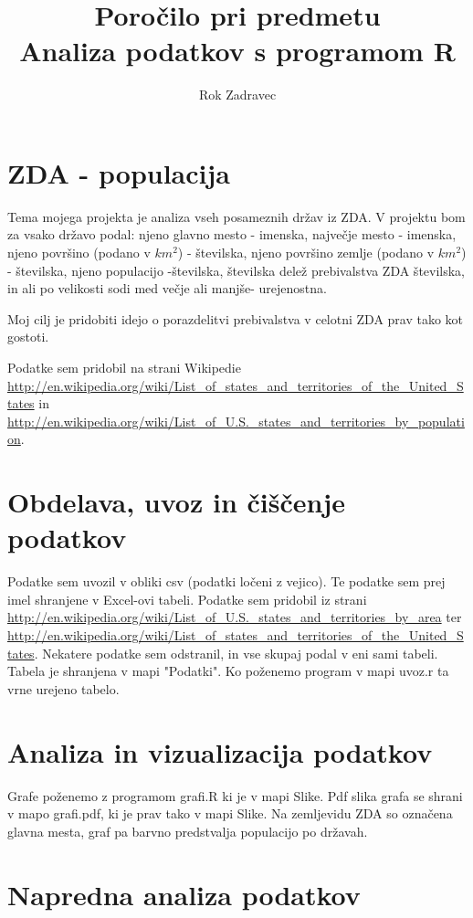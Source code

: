 \documentclass[11pt,a4paper]{article}
\begin{document}
\title{Poročilo pri predmetu \\
Analiza podatkov s programom R}
\author{Rok Zadravec}
\maketitle

\section{ZDA - populacija}

Tema mojega projekta je analiza vseh posameznih držav iz ZDA. V projektu bom za vsako državo podal: njeno glavno mesto - imenska, največje mesto - imenska, njeno površino (podano v $km^2$) - številska, njeno površino zemlje (podano v $km^2$) - številska, njeno populacijo -številska, številska delež prebivalstva ZDA številska, in ali po velikosti sodi med večje ali manjše- urejenostna.

Moj cilj je pridobiti idejo o porazdelitvi prebivalstva v celotni ZDA prav tako kot gostoti.

Podatke sem pridobil na strani Wikipedie \url{http://en.wikipedia.org/wiki/List_of_states_and_territories_of_the_United_States} in \url{http://en.wikipedia.org/wiki/List_of_U.S._states_and_territories_by_population}.

\section{Obdelava, uvoz in čiščenje podatkov}

Podatke sem uvozil v obliki csv (podatki ločeni z vejico). Te podatke sem prej imel shranjene v Excel-ovi tabeli. Podatke sem
pridobil iz strani \url{http://en.wikipedia.org/wiki/List_of_U.S._states_and_territories_by_area} ter
\url{http://en.wikipedia.org/wiki/List_of_states_and_territories_of_the_United_States}. Nekatere podatke sem odstranil, in vse skupaj podal v eni sami tabeli. Tabela je shranjena v mapi "Podatki".
Ko poženemo program v mapi uvoz.r ta vrne urejeno tabelo.

\section{Analiza in vizualizacija podatkov}

Grafe poženemo z programom grafi.R ki je v mapi Slike. Pdf slika grafa se shrani v mapo
grafi.pdf,  ki je prav tako v mapi Slike. Na zemljevidu ZDA so označena glavna mesta, graf pa barvno predstvalja populacijo po državah.



\section{Napredna analiza podatkov}




\end{document}

